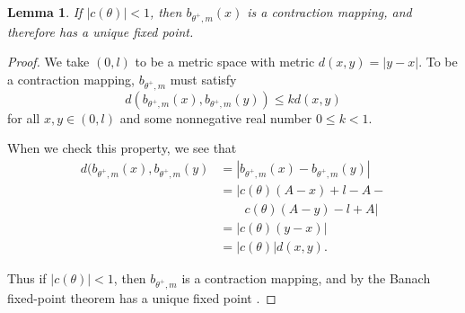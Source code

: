 \documentclass[letterpaper, 10 pt, conference]{ieeeconf}  %
\newtheorem{lemma}{\bf Lemma}
\begin{document}
\begin{lemma} \label{Lemma:4}
If $|c(\theta)| < 1$, then $b_{\theta^+,m}(x)$ is a contraction
mapping, and therefore has a unique fixed point.
\end{lemma}
\begin{proof}
We take $(0,l)$ to be a metric space with metric $d(x,y) =
|y-x|$. To be a contraction mapping, $b_{\theta^+,m}$ must satisfy
\begin{equation*}
d(b_{\theta^+,m}(x), b_{\theta^+,m}(y)) \leq k d(x,y) 
\end{equation*}
\noindent for all $x, y \in (0,l)$ and some nonnegative real number $0 \leq k < 1$.

When we check this property, we see that
\begin{align*}
d(b_{\theta^+,m}(x), b_{\theta^+,m}(y) & = | b_{\theta^+,m}(x) - b_{\theta^+,m}(y)|\\
								 & = | c(\theta)(A-x)+l-A - \\
								 & \qquad c(\theta)(A-y)-l+A| \\
                               & = | c(\theta) (y-x) | \\
                               & = | c(\theta) | d(x,y).
\end{align*}

Thus if $|c(\theta)| <1$, then $b_{\theta^+,m}$ is a contraction mapping, and by the Banach fixed-point
theorem has a unique fixed point \cite{Granas2003}.
\end{proof}
\end{document}
